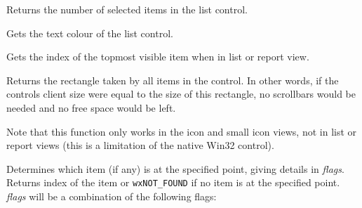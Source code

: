 \twocolwidtha{5cm}
\begin{twocollist}\itemsep=0pt
\end{twocollist}


\label{wxlistctrlgetselecteditemcount}


Returns the number of selected items in the list control.


\label{wxlistctrlgettextcolour}


Gets the text colour of the list control.


\label{wxlistctrlgettopitem}


Gets the index of the topmost visible item when in
list or report view.



\label{wxlistctrlgetviewrect}


Returns the rectangle taken by all items in the control. In other words, if the
controls client size were equal to the size of this rectangle, no scrollbars
would be needed and no free space would be left.

Note that this function only works in the icon and small icon views, not in
list or report views (this is a limitation of the native Win32 control).



\label{wxlistctrlhittest}


Determines which item (if any) is at the specified point,
giving details in {\it flags}. Returns index of the item or {\tt wxNOT\_FOUND}
if no item is at the specified point.
{\it flags} will be a combination of the following flags:

